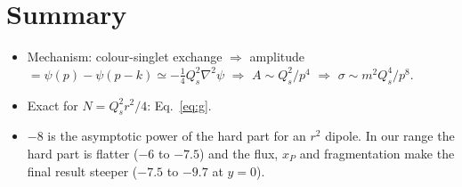 \documentclass[12pt]{article}
\begin{document}
\section*{Summary}

\begin{itemize}
\item Mechanism: colour-singlet exchange $\Rightarrow$ amplitude $=\psi(p)-\psi(p-k)\simeq-\tfrac14Q_s^2\nabla^2\psi$
$\Rightarrow$ $A\sim Q_s^2/p^4$ $\Rightarrow$ $\sigma\sim m^2Q_s^4/p^8$.
\item Exact for $N=Q_s^2r^2/4$: Eq.~\eqref{eq:g}.
\item $-8$ is the asymptotic power of the hard part for an $r^2$ dipole. In our range the hard part is
flatter ($-6$ to $-7.5$) and the flux, $x_P$ and fragmentation make the final result steeper
($-7.5$ to $-9.7$ at $y=0$).
\end{itemize}
\end{document}
